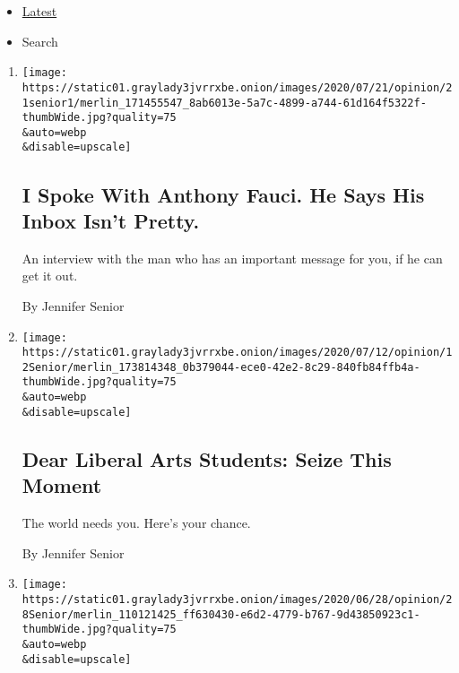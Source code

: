 \begin{itemize}
\tightlist
\item
  \protect\hyperlink{stream-panel}{Latest}
\item
  Search
\end{itemize}

\begin{enumerate}
\def\labelenumi{\arabic{enumi}.}
\item
  \href{/2020/07/21/opinion/anthony-fauci-coronavirus.html}{}

  \texttt{[image: https://static01.graylady3jvrrxbe.onion/images/2020/07/21/opinion/21senior1/merlin\_171455547\_8ab6013e-5a7c-4899-a744-61d164f5322f-thumbWide.jpg?quality=75\\\&auto=webp\\\&disable=upscale]}

  \hypertarget{i-spoke-with-anthony-fauci-he-says-his-inbox-isnt-pretty}{%
  \subsection{I Spoke With Anthony Fauci. He Says His Inbox Isn't
  Pretty.}\label{i-spoke-with-anthony-fauci-he-says-his-inbox-isnt-pretty}}

  An interview with the man who has an important message for you, if he
  can get it out.

  By Jennifer Senior
\item
  \href{/2020/07/12/opinion/liberal-arts-college-covid.html}{}

  \texttt{[image: https://static01.graylady3jvrrxbe.onion/images/2020/07/12/opinion/12Senior/merlin\_173814348\_0b379044-ece0-42e2-8c29-840fb84ffb4a-thumbWide.jpg?quality=75\\\&auto=webp\\\&disable=upscale]}

  \hypertarget{dear-liberal-arts-students-seize-this-moment}{%
  \subsection{Dear Liberal Arts Students: Seize This
  Moment}\label{dear-liberal-arts-students-seize-this-moment}}

  The world needs you. Here's your chance.

  By Jennifer Senior
\item
  \href{/2020/06/28/opinion/trump-newt-gingrich.html}{}

  \texttt{[image: https://static01.graylady3jvrrxbe.onion/images/2020/06/28/opinion/28Senior/merlin\_110121425\_ff630430-e6d2-4779-b767-9d43850923c1-thumbWide.jpg?quality=75\\\&auto=webp\\\&disable=upscale]}


\end{enumerate}
